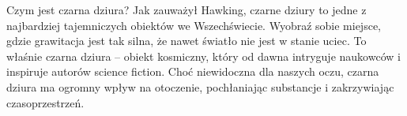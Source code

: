 \begin{frame}{Czym jest czarna dziura?}
Jak zauważył Hawking, czarne dziury to jedne z najbardziej tajemniczych obiektów we Wszechświecie. Wyobraź sobie miejsce, gdzie grawitacja jest tak silna, że nawet światło nie jest w stanie uciec. To właśnie czarna dziura – obiekt kosmiczny, który od dawna intryguje naukowców i inspiruje autorów science fiction. Choć niewidoczna dla naszych oczu, czarna dziura ma ogromny wpływ na otoczenie, pochłaniając substancje i zakrzywiając czasoprzestrzeń.
\end{frame}
